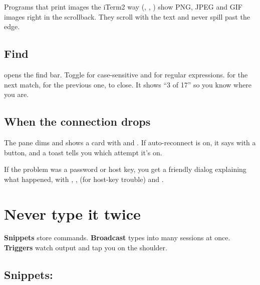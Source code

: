 Programs that print images the iTerm2 way (, , ) show PNG,
JPEG and GIF images right in the scrollback. They scroll with the text and never spill past the edge.


\section{Find}

 opens the find bar. Toggle  for case-sensitive and  for regular expressions.
 for the next match,  for the previous one,  to close. It shows
``3 of 17'' so you know where you are.

\section{When the connection drops}

The pane dims and shows a  card with  and . If auto-reconnect is on,
it says  with a  button, and a toast tells you which attempt it's on.

If the problem was a password or host key, you get a friendly dialog explaining what happened, with
, ,  (for host-key trouble) and .


\chapter{Never type it twice}\label{ch:repeat}

\begin{tldr}
\textbf{Snippets} store commands. \textbf{Broadcast} types into many sessions at once. \textbf{Triggers} watch output and
tap you on the shoulder.
\end{tldr}

\section{Snippets: }

